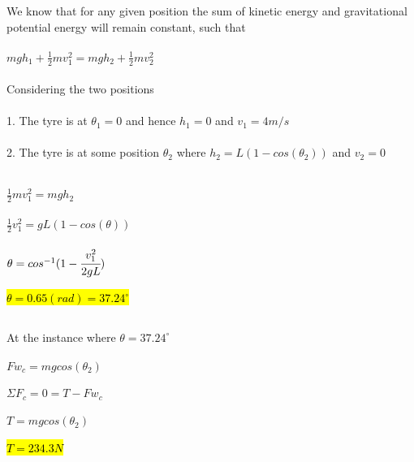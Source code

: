 \documentclass{article}
\begin{document}
\subsection{}

We know that for any given position the sum of kinetic energy and gravitational potential energy will remain constant, such that\\ \\
$mgh_1 + \frac{1}{2}mv_1^2 = mgh_2 + \frac{1}{2}mv_2^2$\\ \\
Considering the two positions\\ \\
1. The tyre is at $\theta_1 = 0$ and hence $h_1 = 0$ and $v_1 = 4m/s$\\ \\
2. The tyre is at some position $\theta_2$ where $h_2 = L(1 - cos(\theta_2))$ and $v_2 = 0$\\ \\
\begin{wrapfigure}{r}{0.35\textwidth}

   
\end{wrapfigure}
$\frac{1}{2}mv_1^2 = mgh_2$\\ \\
$\frac{1}{2}v_1^2 = gL(1-cos(\theta))$\\ \\
$\theta = cos^{-1}(1 - \cfrac{v_1^2}{2gL})$\\ \\
\hl{$\theta = 0.65 (rad) = 37.24^{\circ}$}
\subsection{}
At the instance where $\theta = 37.24^{\circ}$ \\ \\
$Fw_c = mgcos(\theta_2)$\\ \\
$\Sigma F_c = 0 = T - Fw_c$\\ \\
$T = mgcos(\theta_2)$\\ \\
\hl{$T = 234.3N$}
\end{document}
